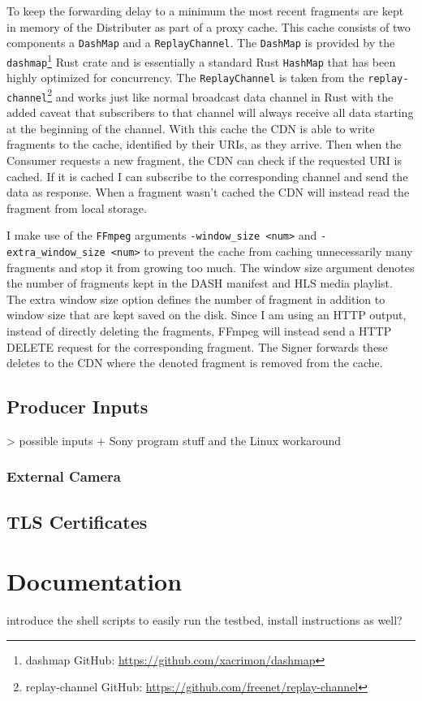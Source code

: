 To keep the forwarding delay to a minimum the most recent fragments are kept in memory of the Distributer as part of a proxy cache. This cache consists of two components a \texttt{DashMap} and a \texttt{ReplayChannel}. The \texttt{DashMap} is provided by the \texttt{dashmap}\footnote{dashmap GitHub: \url{https://github.com/xacrimon/dashmap}} Rust crate and is essentially a standard Rust \texttt{HashMap} that has been highly optimized for concurrency. The \texttt{ReplayChannel} is taken from the \texttt{replay-channel}\footnote{replay-channel GitHub: \url{https://github.com/freenet/replay-channel}} and works just like normal broadcast data channel in Rust with the added caveat that subscribers to that channel will always receive all data starting at the beginning of the channel. With this cache the CDN is able to write fragments to the cache, identified by their URIs, as they arrive. Then when the Consumer requests a new fragment, the CDN can check if the requested URI is cached. If it is cached I can subscribe to the corresponding channel and send the data as response. When a fragment wasn't cached the CDN will instead read the fragment from local storage.

I make use of the \texttt{FFmpeg} arguments \texttt{-window\_size <num>} and \texttt{-extra\_window\_size <num>} to prevent the cache from caching unnecessarily many fragments and stop it from growing too much. The window size argument denotes the number of fragments kept in the DASH manifest and HLS media playlist. The extra window size option defines the number of fragment in addition to window size that are kept saved on the disk. Since I am using an HTTP output, instead of directly deleting the fragments, FFmpeg will instead send a HTTP DELETE request for the corresponding fragment. The Signer forwards these deletes to the CDN where the denoted fragment is removed from the cache.

\subsection{Producer Inputs\label{sec:producer_inputs}}

> possible inputs + Sony program stuff and the Linux workaround

\subsubsection{External Camera\label{sec:ext_cam}}

\subsection{TLS Certificates}


\section{Documentation\label{sec:docu}}

introduce the shell scripts to easily run the testbed, install instructions as well?
